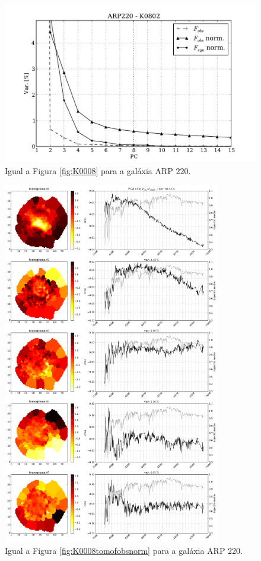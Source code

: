 \begin{figure}
    \includegraphics[height=0.33\textheight]{figuras/K0802-screetest.pdf}
    \caption[Scree test comparativo entre 3 PCAs - ARP 220.]
	{Igual a Figura \ref{fig:K0008} para a galáxia ARP 220.}
    \label{fig:K0802scree}
\end{figure}

\begin{figure}
    \includegraphics[width=0.85\textwidth]{figuras/K0802-tomo-obs-norm.pdf}
    \caption[Tomogramas de 1 a 5 para o cubo $F_{obs}$ norm. - ARP 220.]
    {Igual a Figura \ref{fig:K0008tomofobsnorm} para a galáxia ARP 220.}
    \label{fig:K0802tomofobsnorm}
\end{figure}

